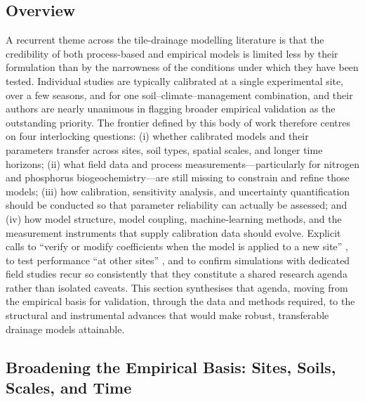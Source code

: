 \subsection{Overview}

A recurrent theme across the tile-drainage modelling literature is that the credibility of both process-based and empirical models is limited less by their formulation than by the narrowness of the conditions under which they have been tested. Individual studies are typically calibrated at a single experimental site, over a few seasons, and for one soil--climate--management combination, and their authors are nearly unanimous in flagging broader empirical validation as the outstanding priority. The frontier defined by this body of work therefore centres on four interlocking questions: (i) whether calibrated models and their parameters transfer across sites, soil types, spatial scales, and longer time horizons; (ii) what field data and process measurements---particularly for nitrogen and phosphorus biogeochemistry---are still missing to constrain and refine those models; (iii) how calibration, sensitivity analysis, and uncertainty quantification should be conducted so that parameter reliability can actually be assessed; and (iv) how model structure, model coupling, machine-learning methods, and the measurement instruments that supply calibration data should evolve. Explicit calls to ``verify or modify coefficients when the model is applied to a new site'' \parencite{Li2006}, to test performance ``at other sites'' \parencite{Qi2015}, and to confirm simulations with dedicated field studies \parencite{Shipitalo2016,Yousfi2014} recur so consistently that they constitute a shared research agenda rather than isolated caveats. This section synthesises that agenda, moving from the empirical basis for validation, through the data and methods required, to the structural and instrumental advances that would make robust, transferable drainage models attainable.

\subsection{Broadening the Empirical Basis: Sites, Soils, Scales, and Time}


